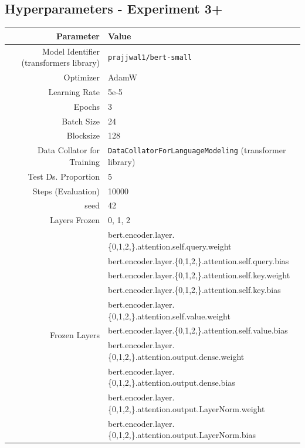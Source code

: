 \documentclass{article}
\begin{document}
\subsection{Hyperparameters - Experiment 3+}
\begin{table}[!h]
    \centering
    \begin{tabular}{r|l}
        Parameter & Value \\ \hline
        Model Identifier (transformers library) & \texttt{prajjwal1/bert-small} \\
        Optimizer & AdamW \\
        Learning Rate & 5e-5 \\
        Epochs & 3 \\
        Batch Size & 24 \\
        Blocksize & 128 \\
        Data Collator for Training & \texttt{DataCollatorForLanguageModeling} (transformer library) \\
        Test Ds. Proportion & 5 \\
        Steps (Evaluation) & 10000 \\
        seed & 42 \\
        Layers Frozen & 0, 1, 2 \\
         \multirow{16}{*}{Frozen Layers} &     bert.encoder.layer.\{0,1,2,\}.attention.self.query.weight \\
                      &      bert.encoder.layer.\{0,1,2,\}.attention.self.query.bias \\
                      &      bert.encoder.layer.\{0,1,2,\}.attention.self.key.weight \\
                      &      bert.encoder.layer.\{0,1,2,\}.attention.self.key.bias \\
                      &      bert.encoder.layer.\{0,1,2,\}.attention.self.value.weight \\
                      &      bert.encoder.layer.\{0,1,2,\}.attention.self.value.bias \\
                      &      bert.encoder.layer.\{0,1,2,\}.attention.output.dense.weight \\
                      &      bert.encoder.layer.\{0,1,2,\}.attention.output.dense.bias \\
                      &      bert.encoder.layer.\{0,1,2,\}.attention.output.LayerNorm.weight \\
                      &      bert.encoder.layer.\{0,1,2,\}.attention.output.LayerNorm.bias \\

\end{tabular}
\end{table}
\end{document}
